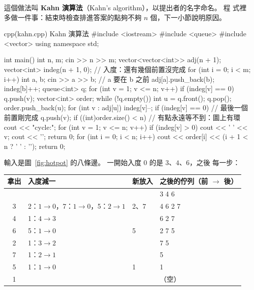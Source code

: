 這個做法叫 \textbf{Kahn 演算法}（Kahn's algorithm），以提出者的名字命名。 程
式裡多做一件事：結束時檢查排進答案的點夠不夠 $n$ 個，下一小節說明原因。

\begin{example}[label=ex:kahn]{cpp}{(kahn.cpp) Kahn 演算法}
#include <iostream>
#include <queue>
#include <vector>
using namespace std;

int main() {
    int n, m;
    cin >> n >> m;
    vector<vector<int>> adj(n + 1);
    vector<int> indeg(n + 1, 0);           // 入度：還有幾個前置沒完成
    for (int i = 0; i < m; i++) {
        int a, b;
        cin >> a >> b;                     // a 要在 b 之前
        adj[a].push_back(b);
        indeg[b]++;
    }
    queue<int> q;
    for (int v = 1; v <= n; v++) {
        if (indeg[v] == 0) {
            q.push(v);
        }
    }
    vector<int> order;
    while (!q.empty()) {
        int u = q.front();
        q.pop();
        order.push_back(u);
        for (int v : adj[u]) {
            indeg[v]--;
            if (indeg[v] == 0) {           // 最後一個前置剛完成
                q.push(v);
            }
        }
    }
    if ((int)order.size() < n) {           // 有點永遠等不到：圖上有環
        cout << "cycle:";
        for (int v = 1; v <= n; v++) {
            if (indeg[v] > 0) {
                cout << ' ' << v;
            }
        }
        cout << '\n';
        return 0;
    }
    for (int i = 0; i < n; i++) {
        cout << order[i] << (i + 1 < n ? ' ' : '\n');
    }
    return 0;
}
\end{example}


輸入是圖~\ref{fig:hotpot} 的八條邊。 一開始入度 $0$ 的是 $3$、$4$、$6$，之後
每一步：

\begin{center}
\begin{tabular}{clll}
\toprule
拿出 & 入度減一 & 新放入 & 之後的佇列（前 $\to$ 後） \\
\midrule
 & & & 3 4 6 \\
3 & 2：$1 \to 0$，7：$1 \to 0$，5：$2 \to 1$ & 2、7 & 4 6 2 7 \\
4 & 1：$4 \to 3$ & & 6 2 7 \\
6 & 5：$1 \to 0$ & 5 & 2 7 5 \\
2 & 1：$3 \to 2$ & & 7 5 \\
7 & 1：$2 \to 1$ & & 5 \\
5 & 1：$1 \to 0$ & 1 & 1 \\
1 & & & （空）\\
\bottomrule
\end{tabular}
\end{center}


